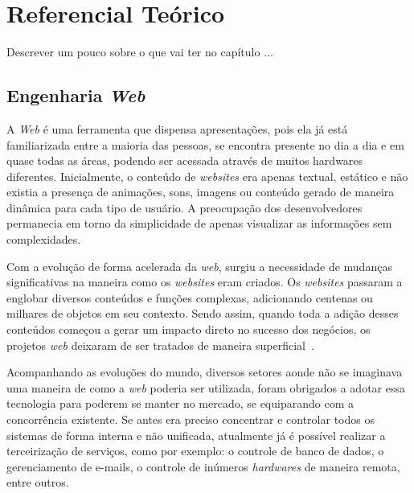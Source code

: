 \chapter{Referencial Teórico}
\label{sec-referencial}

Descrever um pouco sobre o que vai ter no capítulo ...

\section{Engenharia \textit{Web}}
\label{sec-ref-engenharia-web}


A \textit{Web} é uma ferramenta que dispensa apresentações, pois ela já está familiarizada entre a maioria das pessoas, se encontra presente no dia a dia e em quase todas as áreas, podendo ser acessada através de muitos hardwares diferentes. Inicialmente, o conteúdo de \textit{websites} era apenas textual, estático e não existia a presença de animações, sons, imagens ou conteúdo gerado de maneira dinâmica para cada tipo de usuário. A preocupação dos desenvolvedores permanecia em torno da simplicidade de apenas visualizar as informações sem complexidades.

Com a evolução de forma acelerada da \textit{web}, surgiu a necessidade de mudanças significativas na maneira como os \textit{websites} eram criados. Os \textit{websites} passaram a englobar diversos conteúdos e funções complexas, adicionando centenas ou milhares de objetos em seu contexto. Sendo assim, quando toda a adição desses conteúdos começou a gerar um impacto direto no sucesso dos negócios, os projetos \textit{web} deixaram de ser tratados de maneira superficial~\cite{pressman:es11}.

Acompanhando as evoluções do mundo, diversos setores aonde não se imaginava uma maneira de como a \textit{web} poderia ser utilizada, foram obrigados a adotar essa tecnologia para poderem se manter no mercado, se equiparando com a concorrência existente. Se antes era preciso concentrar e controlar todos os sistemas de forma interna e não unificada, atualmente já é possível realizar a terceirização de serviços, como por exemplo: o controle de banco de dados, o gerenciamento de e-mails, o controle de inúmeros \textit{hardwares} de maneira remota, entre outros.

